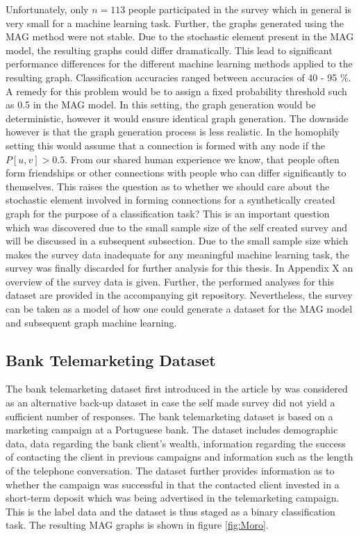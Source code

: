   \noindent Unfortunately, only $n=113$ people participated in the survey which 
  in general is very small for a machine learning task.
  Further, the graphs generated using the MAG method were not stable. Due to
  the stochastic element present in the MAG model, the resulting graphs could
  differ dramatically. This lead to significant performance differences for the
  different machine learning methods applied to the resulting graph.
  Classification accuracies ranged between accuracies of 40 - 95 \%. A remedy
  for this problem would be to assign a fixed probability threshold such as 0.5
  in the MAG model. In this setting, the graph generation would be
  deterministic, however it would ensure identical graph generation. The
  downside however is that the graph generation process is less realistic. In
  the homophily setting this would assume that a connection is formed with any
  node if the $P[u,v]>0.5$. From our shared human experience we know, that
  people often form friendships or other connections with people who can differ
  significantly to themselves. This raises the question as to whether we should
  care about the stochastic element involved in forming connections for a
  synthetically created graph for the purpose of a classification task? This is
  an important question which was discovered due to the small sample size of
  the self created survey and will be discussed in a subsequent subsection. 
  Due to the small sample size which makes the survey data inadequate for any
  meaningful machine learning task, the survey was finally discarded for
  further analysis for this thesis. In Appendix X an overview of the survey
  data is given. Further, the performed analyses for this dataset are provided
  in the accompanying git repository. Nevertheless, the survey can be taken as
  a model of how one could generate a dataset for the MAG model and subsequent
  graph machine learning. 


  \subsection{Bank Telemarketing Dataset}

  The bank telemarketing dataset first introduced in the article by
  \cite{moro2011using,moro2014data} was considered as an alternative back-up 
  dataset in case the self made survey did not yield a sufficient number of 
  responses. The bank telemarketing dataset is based on a marketing campaign at 
  a Portuguese bank. The dataset includes demographic data, data regarding the 
  bank client's wealth, information regarding the success of contacting the 
  client in previous campaigns and information such as the length of the 
  telephone conversation. The dataset further provides information as to whether 
  the campaign was successful in that the contacted client invested in a short-term 
  deposit which was being advertised in the telemarketing campaign. This is the
  label data and the dataset is thus staged as a binary classification task.
  The resulting MAG graphs is shown in figure \ref{fig:Moro}.
 
